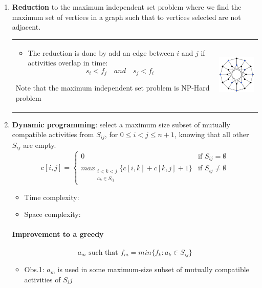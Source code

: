 \begin{enumerate}
    \item \textbf{Reduction} to the maximum independent set problem where 
        we find the maximum set of vertices in a graph such that
        to vertices selected are not adjacent.

        \begin{tabular}{m{10cm}m{3cm}}
            \begin{itemize}
                \item The reduction is done by add an edge between $i$ and $j$ if
                    activities overlap in time: 
                    $$s_i < f_j \quad and \quad s_j < f_i$$ 
            \end{itemize}
            Note that the maximum independent set problem is NP-Hard problem
            &
            \includegraphics[width=3cm]{img/independant}
        \end{tabular}


    \item \textbf{Dynamic programming}: select a maximum size subset of mutually
        compatible activities from $S_{ij}$, for $0 \leq i < j \leq n+1$,
        knowing that all other $S_{ij}$ are empty.
        \[
            c[i, j] = 
            \begin{cases} 
                0 & \text{if } S_{ij} = \emptyset \\
                max_{\substack{i<k<j \\ a_k \in S_{ij}}} \{c[i, k] + c[k, j] + 1\}  & \text{if } S_{ij} \neq \emptyset
            \end{cases}
        \]
        \begin{itemize}
            \item Time complexity: 
            \item Space complexity: 
        \end{itemize}

        \paragraph{Improvement to a greedy}
        $$a_m\textrm{ such that }f_m = min\{f_k: a_k \in S_{ij}\}$$
        \begin{itemize}
            \item Obs.1: $a_m$ is used in some maximum-size subset of
                mutually compatible activities of $S_ij$


\end{itemize}
\end{enumerate}
